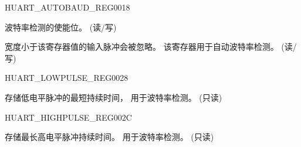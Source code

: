 \begin{register}{H}{UART\_AUTOBAUD\_REG}{\hexprefix{}0018}\label{regdesc:UARTAUTOBAUDREG}
%
%
%
%
\regnewline%
\begin{regdesc}\begin{reglist}
\label{fielddesc:UARTAUTOBAUDEN}\item [UART\_AUTOBAUD\_EN] 波特率检测的使能位。 (读/写)
\label{fielddesc:UARTGLITCHFILT}\item [UART\_GLITCH\_FILT] 宽度小于该寄存器值的输入脉冲会被忽略。
该寄存器用于自动波特率检测。 (读/写)
\end{reglist}\end{regdesc}
\end{register}


\begin{register}{H}{UART\_LOWPULSE\_REG}{\hexprefix{}0028}\label{regdesc:UARTLOWPULSEREG}
%
%
\regnewline%
\begin{regdesc}\begin{reglist}
\label{fielddesc:UARTLOWPULSEMINCNT}\item [UART\_LOWPULSE\_MIN\_CNT] 存储低电平脉冲的最短持续时间， 用于波特率检测。 (只读)
\end{reglist}\end{regdesc}
\end{register}


\begin{register}{H}{UART\_HIGHPULSE\_REG}{\hexprefix{}002C}\label{regdesc:UARTHIGHPULSEREG}
%
%
\regnewline%
\begin{regdesc}\begin{reglist}
\label{fielddesc:UARTHIGHPULSEMINCNT}\item [UART\_HIGHPULSE\_MIN\_CNT] 存储最长高电平脉冲持续时间。 用于波特率检测。 (只读)
\end{reglist}\end{regdesc}
\end{register}


